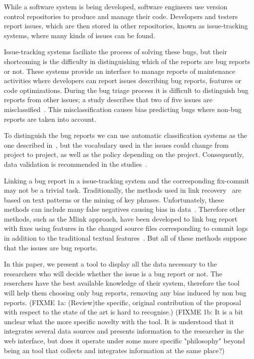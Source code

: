 \documentclass[runningheads,a4paper]{llncs}
\begin{document}
While a software system is being developed, software engineers use version control repositories to produce and manage their code. Developers and testers report issues, which are then stored in other repositories, known as issue-tracking systems, where many kinds of issues can be found.

Issue-tracking systems faciliate the process of solving these bugs, but their shortcoming is the difficulty in distinguishing which of the reports are bug reports or not. These systems provide an interface to manage reports of maintenance activities where developers can report issues describing bug reports, features or code optimizations. During the bug triage process it is difficult to distinguish bug reports from other issues; a study describes that two of five issues are misclassified~\cite{Herzig}. This misclassification causes bias predicting bugs where non-bug reports are taken into account.

To distinguish the bug reports we can use automatic classification systems as the one described in~\cite{Antoniol}, but the vocabulary used in the issues could change from project to project, as well as the policy depending on the project. Consequently, data validation is recommended in the studies~\cite{Herzig}.

Linking a bug report in a issue-tracking system and the corresponding fix-commit may not be a trivial task. Traditionally, the methods used in link recovery~\cite{Zimmermann, Thomas} are based on text patterns or the mining of key phrases. Unfortunately, these methods can include many false negatives causing bias in data~\cite{Bird, NguyenTH}. Therefore other methods, such as the Mlink approach, have been developed to link bug report with fixes using features in the changed source files corresponding to commit logs in addition to the traditional textual features~\cite{Nguyen}. But all of these methods suppose that the issues are bug reports.

In this paper, we present a tool to display all the data necessary to the researchers who will decide whether the issue is a bug report or not. The reserchers have the best available knowledge of their system, therefore the tool will help them choosing only bug reports, removing any bias induced by non bug reports. (FIXME 1a: (Review)the specific, original contribution of the proposal with respect to the state of the art is hard to recognise.)
(FIXME 1b:  It is a bit unclear what the more specific novelty with the tool. It is understood that it integrates several data sources and presents information to the researcher in the web interface, but does it operate under some more specific "philosophy" beyond being an tool that collects and integrates information at the same place?)
\end{document}
